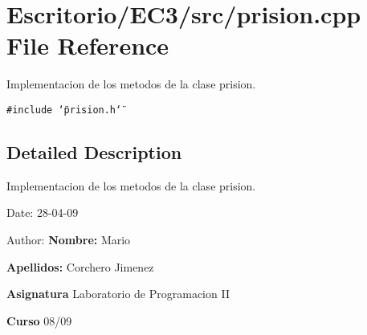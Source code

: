 \section{Escritorio/EC3/src/prision.cpp File Reference}
\label{prision_8cpp}
Implementacion de los metodos de la clase prision. 

{\tt \#include \char`\"{}prision.h\char`\"{}}\par


\subsection{Detailed Description}
Implementacion de los metodos de la clase prision. 

\begin{Desc}
\item[Date:]28-04-09 \end{Desc}
\begin{Desc}
\item[Author:]{\bf Nombre:} Mario \par
 {\bf Apellidos:} Corchero Jimenez \par
 {\bf Asignatura} Laboratorio de Programacion II \par
 {\bf Curso} 08/09 \end{Desc}
